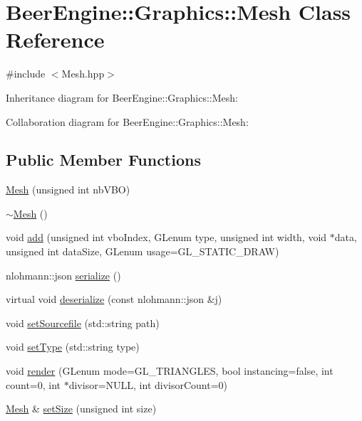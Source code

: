 \hypertarget{class_beer_engine_1_1_graphics_1_1_mesh}{}\section{Beer\+Engine\+:\+:Graphics\+:\+:Mesh Class Reference}
\label{class_beer_engine_1_1_graphics_1_1_mesh}


{\ttfamily \#include $<$Mesh.\+hpp$>$}



Inheritance diagram for Beer\+Engine\+:\+:Graphics\+:\+:Mesh\+:


Collaboration diagram for Beer\+Engine\+:\+:Graphics\+:\+:Mesh\+:
\subsection*{Public Member Functions}
\begin{DoxyCompactItemize}
\item 
\mbox{\hyperlink{class_beer_engine_1_1_graphics_1_1_mesh_ae159a28de064d54eb46449409fc9fe4c}{Mesh}} (unsigned int nb\+V\+BO)
\item 
\mbox{\hyperlink{class_beer_engine_1_1_graphics_1_1_mesh_a431d1ff7416183e410ffd9b7de1bace3}{$\sim$\+Mesh}} ()
\item 
void \mbox{\hyperlink{class_beer_engine_1_1_graphics_1_1_mesh_a72b23ade4bb8777ff85c36c0e0920725}{add}} (unsigned int vbo\+Index, G\+Lenum type, unsigned int width, void $\ast$data, unsigned int data\+Size, G\+Lenum usage=G\+L\+\_\+\+S\+T\+A\+T\+I\+C\+\_\+\+D\+R\+AW)
\item 
nlohmann\+::json \mbox{\hyperlink{class_beer_engine_1_1_graphics_1_1_mesh_a2bdd2912e84c9e2d686bdad2dbf6ec9e}{serialize}} ()
\item 
virtual void \mbox{\hyperlink{class_beer_engine_1_1_graphics_1_1_mesh_a888ed58ac7ecc446be640f7fe5f546ee}{deserialize}} (const nlohmann\+::json \&j)
\item 
void \mbox{\hyperlink{class_beer_engine_1_1_graphics_1_1_mesh_a9c0d91380cd84b6850e850ed9b4d61ed}{set\+Sourcefile}} (std\+::string path)
\item 
void \mbox{\hyperlink{class_beer_engine_1_1_graphics_1_1_mesh_a296b58a337dab85843a69f1dced68125}{set\+Type}} (std\+::string type)
\item 
void \mbox{\hyperlink{class_beer_engine_1_1_graphics_1_1_mesh_a450ceb1ed5555ad5f57f29700a1d5311}{render}} (G\+Lenum mode=G\+L\+\_\+\+T\+R\+I\+A\+N\+G\+L\+ES, bool instancing=false, int count=0, int $\ast$divisor=N\+U\+LL, int divisor\+Count=0)
\item 
\mbox{\hyperlink{class_beer_engine_1_1_graphics_1_1_mesh}{Mesh}} \& \mbox{\hyperlink{class_beer_engine_1_1_graphics_1_1_mesh_ad149bbda494d7043fe49de9571534f03}{set\+Size}} (unsigned int size)
\end{DoxyCompactItemize}
